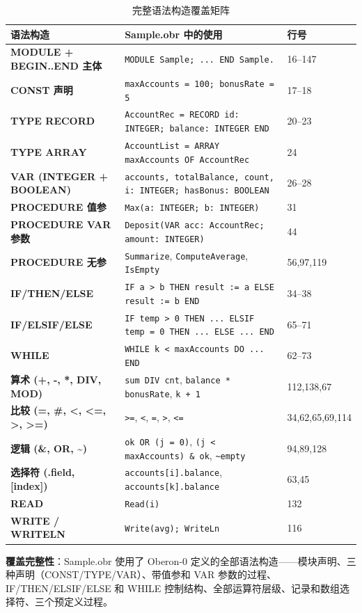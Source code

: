 \documentclass[12pt,a4paper,fontset=none]{ctexart}
\begin{document}
\begin{table}[H]\centering
\scriptsize
\begin{tabularx}{\textwidth}{>{\bfseries}P{3.2cm}YP{2.5cm}}
\toprule
语法构造 & Sample.obr 中的使用 & 行号 \\
\midrule
MODULE + BEGIN..END 主体 & \texttt{MODULE Sample; ... END Sample.} & 16--147 \\
CONST 声明 & \texttt{maxAccounts = 100; bonusRate = 5} & 17--18 \\
TYPE RECORD & \texttt{AccountRec = RECORD id: INTEGER; balance: INTEGER END} & 20--23 \\
TYPE ARRAY & \texttt{AccountList = ARRAY maxAccounts OF AccountRec} & 24 \\
VAR (INTEGER + BOOLEAN) & \texttt{accounts, totalBalance, count, i: INTEGER; hasBonus: BOOLEAN} & 26--28 \\
PROCEDURE 值参 & \texttt{Max(a: INTEGER; b: INTEGER)} & 31 \\
PROCEDURE VAR 参数 & \texttt{Deposit(VAR acc: AccountRec; amount: INTEGER)} & 44 \\
PROCEDURE 无参 & \texttt{Summarize}, \texttt{ComputeAverage}, \texttt{IsEmpty} & 56,97,119 \\
IF/THEN/ELSE & \texttt{IF a > b THEN result := a ELSE result := b END} & 34--38 \\
IF/ELSIF/ELSE & \texttt{IF temp > 0 THEN ... ELSIF temp = 0 THEN ... ELSE ... END} & 65--71 \\
WHILE & \texttt{WHILE k < maxAccounts DO ... END} & 62--73 \\
算术 (+, -, *, DIV, MOD) & \texttt{sum DIV cnt}, \texttt{balance * bonusRate}, \texttt{k + 1} & 112,138,67 \\
比较 (=, \#, <, <=, >, >=) & \texttt{>=}, \texttt{<}, \texttt{=}, \texttt{>}, \texttt{<=} & 34,62,65,69,114 \\
逻辑 (\&, OR, \~{}) & \texttt{ok OR (j = 0)}, \texttt{(j < maxAccounts) \& ok}, \texttt{\~{}empty} & 94,89,128 \\
选择符 (.field, [index]) & \texttt{accounts[i].balance}, \texttt{accounts[k].balance} & 63,45 \\
READ & \texttt{Read(i)} & 132 \\
WRITE / WRITELN & \texttt{Write(avg); WriteLn} & 116 \\
\bottomrule
\end{tabularx}
\caption{完整语法构造覆盖矩阵}
\label{tab:coverage}
\end{table}

\begin{plainBox}
\textbf{覆盖完整性}：Sample.obr 使用了 Oberon-0 定义的全部语法构造——模块声明、三种声明（CONST/TYPE/VAR）、带值参和 VAR 参数的过程、IF/THEN/ELSIF/ELSE 和 WHILE 控制结构、全部运算符层级、记录和数组选择符、三个预定义过程。
\end{plainBox}
\end{document}
